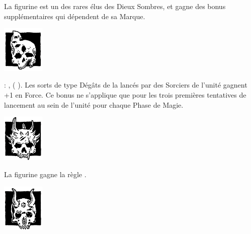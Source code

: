 \newpage
\armyspecialruleentry{\chosenofthegods}

La figurine est un des rares élus des Dieux Sombres, et gagne des bonus supplémentaires qui dépendent de sa Marque.

\begin{multicols}{2}

\begin{center}\includegraphics[width=2cm]{pics/change.png}

\noindent\textbf{\chosenofchange}
\end{center}

\wizardconclave{} : \changesignature{}, \changespellone{} (\Pathof{} \change{}). Les sorts de type Dégâts de la \Pathof{} \change{} lancés par des Sorciers de l'unité gagnent +1 en Force. Ce bonus ne s'applique que pour les trois premières tentatives de lancement au sein de l'unité pour chaque Phase de Magie.

\vspace*{0.2cm}\vspace*{\fill}

\begin{center}\includegraphics[width=2cm]{pics/wrath.png}

\noindent\textbf{\chosenofwrath}
\end{center}

La figurine gagne la règle \frenzy{}.

\columnbreak

\begin{center}\includegraphics[width=2cm]{pics/lust.png}

\noindent\textbf{\chosenoflust}
\end{center}


\end{multicols}
